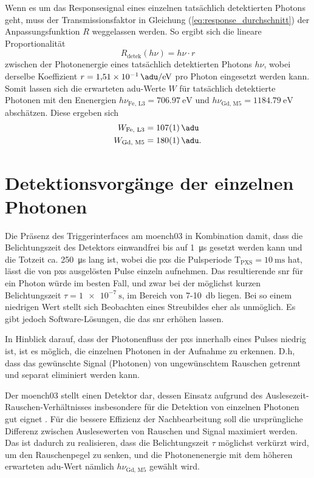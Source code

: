 \noindent
Wenn es um das Responsesignal eines einzelnen tatsächlich detektierten Photons geht, muss der Transmissionsfaktor in Gleichung (\ref{eq:response_durchschnitt}) der Anpassungsfunktion $R$ weggelassen werden. So ergibt sich die lineare Proportionalität
\begin{equation}
    R_\text{detek}(h\nu) = h\nu \cdot r
    \label{eq:adu_to_ev}
\end{equation}
zwischen der Photonenergie eines tatsächlich detektierten Photons $h\nu$, wobei derselbe Koeffizient $r = \SI{1.51e-1}{\adu\per\eV}$ pro Photon eingesetzt werden kann. Somit lassen sich die erwarteten \gls{adu}-Werte $W$ für tatsächlich detektierte Photonen mit den Enenergien $h\nu_{\text{Fe, L3}} = \SI{706.97}{\eV}$ und $h\nu_{\text{Gd, M5}} = \SI{1184.79}{\eV}$ abschätzen. Diese ergeben sich 
\begin{equation}
\begin{split}
     W_{\text{Fe, L3}} &=  \SI{107(1)}{\adu}\\
     W_{\text{Gd, M5}} &=  \SI{180(1)}{\adu}.
\end{split}
\label{eq:auselesewerte_fe_gd}
\end{equation}


\section{Detektionsvorgänge der einzelnen Photonen}
\label{text:single_photon_theorie}
Die Präsenz des Triggerinterfaces am \gls{moench03} in Kombination damit, dass die Belichtungszeit des Detektors einwandfrei bis auf \SI{1}{\micro\second} gesetzt werden kann und die Totzeit ca. \SI{250}{\micro\second} lang ist, wobei die \gls{pxs} die Pulsperiode T$_\text{PXS} = \SI{10}{\milli\second}$ hat, lässt die von \gls{pxs} ausgelösten Pulse einzeln aufnehmen. Das resultierende \gls{snr} für ein Photon würde im besten Fall, und zwar bei der möglichst kurzen Belichtungszeit $\tau = \SI{1e-7}{\second}$, im Bereich von 7-\SI{10}{\decibel} liegen. Bei so einem niedrigen Wert stellt sich Beobachten eines Streubildes eher als unmöglich. Es gibt jedoch Software-Lösungen, die das \gls{snr} erhöhen lassen.  

\noindent
In Hinblick darauf, dass der Photonenfluss der \gls{pxs} innerhalb eines Pulses niedrig ist, ist es möglich, die einzelnen Photonen in der Aufnahme zu erkennen. D.h, dass das gewünschte Signal (Photonen) von ungewünschtem Rauschen getrennt und separat eliminiert werden kann.

\noindent
Der \gls{moench03} stellt einen Detektor dar, dessen Einsatz aufgrund des Auslesezeit-Rauschen-Ver\-hält\-nis\-ses insbesondere für die Detektion von einzelnen Photonen gut eignet \cite{bergamaschi_monch_2018}. Für die bessere Effizienz der Nachbearbeitung soll die ursprüngliche Differenz zwischen Auslesewerten von Rauschen und Signal maximiert werden. Das ist dadurch zu realisieren, dass die Belichtungszeit $\tau$ möglichst verkürzt wird, um den Rauschenpegel zu senken, und die Photonenenergie mit dem höheren erwarteten \gls{adu}-Wert nämlich $h\nu_{\text{Gd, M5}}$ gewählt wird.

